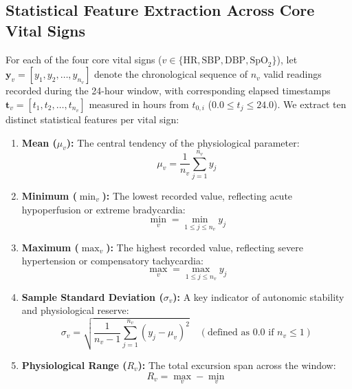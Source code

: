 \subsection{Statistical Feature Extraction Across Core Vital Signs}
\label{subsec:stat_features}

For each of the four core vital signs ($v \in \{\text{HR}, \text{SBP}, \text{DBP}, \text{SpO}_2\}$), let $\mathbf{y}_v = [y_1, y_2, \dots, y_{n_v}]$ denote the chronological sequence of $n_v$ valid readings recorded during the 24-hour window, with corresponding elapsed timestamps $\mathbf{t}_v = [t_1, t_2, \dots, t_{n_v}]$ measured in hours from $t_{0, i}$ ($0.0 \le t_j \le 24.0$). We extract ten distinct statistical features per vital sign:

\begin{enumerate}
    \item \textbf{Mean ($\mu_v$):} The central tendency of the physiological parameter:
    \begin{equation}
    \mu_v = \frac{1}{n_v} \sum_{j=1}^{n_v} y_j
    \end{equation}
    
    \item \textbf{Minimum ($\min_v$):} The lowest recorded value, reflecting acute hypoperfusion or extreme bradycardia:
    \begin{equation}
    \min_v = \min_{1 \le j \le n_v} y_j
    \end{equation}
    
    \item \textbf{Maximum ($\max_v$):} The highest recorded value, reflecting severe hypertension or compensatory tachycardia:
    \begin{equation}
    \max_v = \max_{1 \le j \le n_v} y_j
    \end{equation}
    
    \item \textbf{Sample Standard Deviation ($\sigma_v$):} A key indicator of autonomic stability and physiological reserve:
    \begin{equation}
    \sigma_v = \sqrt{\frac{1}{n_v - 1} \sum_{j=1}^{n_v} (y_j - \mu_v)^2} \quad (\text{defined as } 0.0 \text{ if } n_v \le 1)
    \end{equation}
    
    \item \textbf{Physiological Range ($R_v$):} The total excursion span across the window:
    \begin{equation}
    R_v = \max_v - \min_v
    \end{equation}
    

\end{enumerate}
